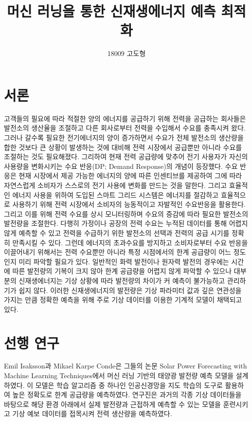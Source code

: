 \documentclass{article}
\begin{document}

\title{머신 러닝을 통한 신재생에너지 예측 최적화}
\author{18009 고도형}
\maketitle

\section{서론}
고객들의 필요에 따라 적절한 양의 에너지를 공급하기 위해 전력을 공급하는 회사들은 발전소의 생산율을 조절하고 다른 회사로부터 전력을 수입해서 수요를 충족시켜 왔다. 그러나 갈수록 필요한 전기에너지의 양이 증가하면서 수요가 전체 발전소의 생산량을 합한 것보다 큰 상황이 발생하는 것에 대비해 전력 시장에서 공급뿐만 아니라 수요를 조절하는 것도 필요해졌다. 그리하여 현재 전력 공급량에 맞추어 전기 사용자가 자신의 사용량을 변화시키는 수요 반응(DP; Demand Response)의 개념이 등장했다. 수요 반응은 현재 시장에서 제공 가능한 에너지의 양에 따른 인센티브를 제공하여 그에 따라 자연스럽게 소비자가 스스로의 전기 사용에 변화를 만드는 것을 말한다. 그리고 효율적인 에너지 사용을 위하여 도입된 스마트 그리드 시스템은 에너지를 절감하고 효율적으로 사용하기 위해 전력 시장에서 소비자의 능동적이고 자발적인 수요반응을 활용한다. 그리고 이를 위해 전력 수요를 상시 모니터링하며 수요의 증감에 따라 필요한 발전소의 발전량을 조절한다. 다행히 가정이나 공장의 전력 수요는 누적된 데이터를 통해 어렵지 않게 예측할 수 있고 전력을 수급하기 위한 발전소의 선택과 전력의 공급 시기를 정확히 만족시킬 수 있다. \newline
그런데 에너지의 초과수요를 방지하고 소비자로부터 수요 반응을 이끌어내기 위해서는 전력 수요뿐만 아니라 특정 시점에서의 한계 공급량이 어느 정도인지 미리 파악할 필요가 있다. 일반적인 화력 발전이나 원자력 발전의 경우에는 시간에 따른 발전량의 기복이 크지 않아 한계 공급량을 어렵지 않게 파악할 수 있으나 대부분의 신재생에너지는 기상 상황에 따라 발전량의 차이가 커 예측이 불가능하고 관리하기가 쉽지 않다. 이러한 신재생에너지의 발전량은 기상 파라미터 값과 깊은 연관성을 가지는 만큼 정확한 예측을 위해 주로 기상 데이터를 이용한 기계적 모델이 채택되고 있다.

\section{선행 연구}
Emil Isaksson과 Mikael Karpe Conde은 그들의 논문 Solar Power Forecasting with Machine Learning Techniques에서 머신 러닝 기반의 태양광 발전량 예측 모델을 설계하였다. 이 모델은 학습 알고리즘 중 하나인 인공신경망을 지도 학습의 도구로 활용하여 높은 정확도로 한계 공급량을 예측하였다. 연구진은 과거의 각종 기상 데이터들을 바탕으로 해당 환경 아래에서 실제 발전량과 근접하게 예측할 수 있는 모델을 훈련시키고 기상 예보 데이터를 접목시켜 전력 생산량을 예측하였다.
\end{document}
